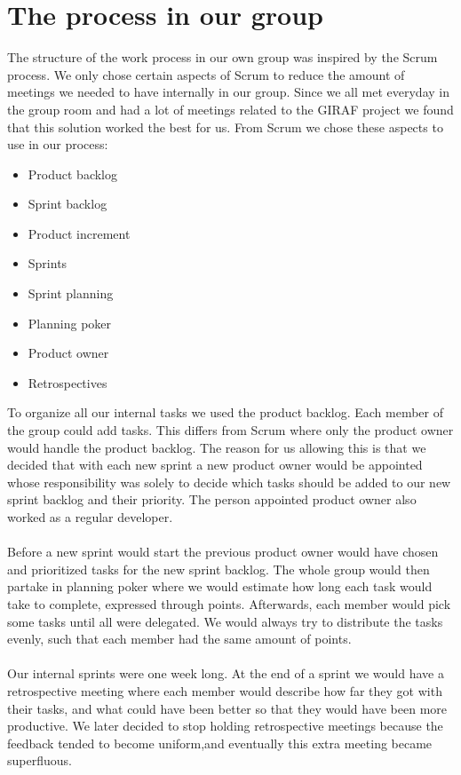 \section{The process in our group}
The structure of the work process in our own group was inspired by the Scrum process.
We only chose certain aspects of Scrum to reduce the amount of meetings we needed to have internally in our group. 
Since we all met everyday in the group room and had a lot of meetings related to the GIRAF project we found that this solution worked the best for us.
From Scrum we chose these aspects to use in our process:

 \begin{itemize}
    \item Product backlog
    \item Sprint backlog
    \item Product increment
    \item Sprints
    \item Sprint planning
    \item Planning poker
    \item Product owner
    \item Retrospectives
 \end{itemize}
To organize all our internal tasks we used the product backlog.
Each member of the group could add tasks.
This differs from Scrum where only the product owner would handle the product backlog.
The reason for us allowing this is that we decided that with each new sprint a new product owner would be appointed whose responsibility was solely to decide which tasks should be added to our new sprint backlog and their priority.
The person appointed product owner also worked as a regular developer.
\\\\
Before a new sprint would start the previous product owner would have chosen and prioritized tasks for the new sprint backlog.
The whole group would then partake in planning poker where we would estimate how long each task would take to complete, expressed through points.
Afterwards, each member would pick some tasks until all were delegated.
We would always try to distribute the tasks evenly, such that each member had the same amount of points.
\\\\
Our internal sprints were one week long.
At the end of a sprint we would have a retrospective meeting where each member would describe how far they got with their tasks, and what could have been better so that they would have been more productive.
We later decided to stop holding retrospective meetings because the feedback tended to become uniform,and eventually this extra meeting became superfluous.


